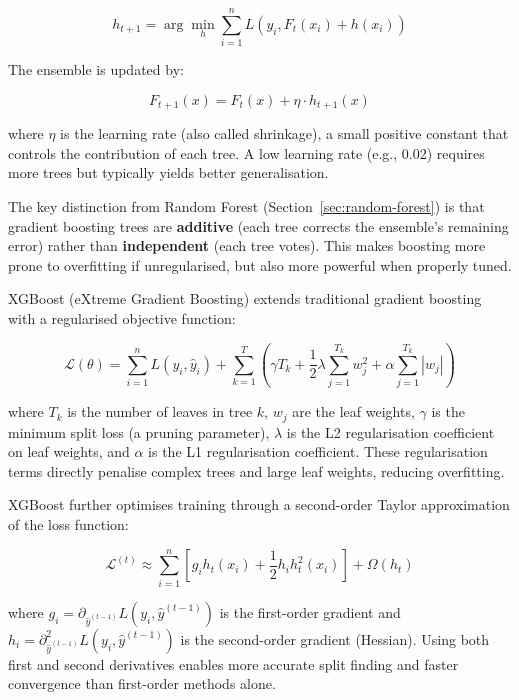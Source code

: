 \documentclass[10pt,a4paper]{article}
\begin{document}
\begin{equation}
h_{t+1} = \arg\min_{h} \sum_{i=1}^{n} L\left(y_i, F_t(x_i) + h(x_i)\right)
\label{eq:boost-objective}
\end{equation}

The ensemble is updated by:

\begin{equation}
F_{t+1}(x) = F_t(x) + \eta \cdot h_{t+1}(x)
\label{eq:boost-update}
\end{equation}

where $\eta$ is the learning rate (also called shrinkage), a small positive constant that controls the contribution of each tree. A low learning rate (e.g., 0.02) requires more trees but typically yields better generalisation.

The key distinction from Random Forest (Section~\ref{sec:random-forest}) is that gradient boosting trees are \textbf{additive} (each tree corrects the ensemble's remaining error) rather than \textbf{independent} (each tree votes). This makes boosting more prone to overfitting if unregularised, but also more powerful when properly tuned.

XGBoost (eXtreme Gradient Boosting) extends traditional gradient boosting with a regularised objective function:

\begin{equation}
\mathcal{L}(\theta) = \sum_{i=1}^{n} L(y_i, \hat{y}_i) + \sum_{k=1}^{T} \left(\gamma T_k + \frac{1}{2}\lambda \sum_{j=1}^{T_k} w_j^2 + \alpha \sum_{j=1}^{T_k} |w_j|\right)
\label{eq:xgb-objective}
\end{equation}

where $T_k$ is the number of leaves in tree $k$, $w_j$ are the leaf weights, $\gamma$ is the minimum split loss (a pruning parameter), $\lambda$ is the L2 regularisation coefficient on leaf weights, and $\alpha$ is the L1 regularisation coefficient. These regularisation terms directly penalise complex trees and large leaf weights, reducing overfitting.

XGBoost further optimises training through a second-order Taylor approximation of the loss function:

\begin{equation}
\mathcal{L}^{(t)} \approx \sum_{i=1}^{n} \left[g_i h_t(x_i) + \frac{1}{2} h_i h_t^2(x_i)\right] + \Omega(h_t)
\label{eq:xgb-taylor}
\end{equation}

where $g_i = \partial_{\hat{y}^{(t-1)}} L(y_i, \hat{y}^{(t-1)})$ is the first-order gradient and $h_i = \partial^2_{\hat{y}^{(t-1)}} L(y_i, \hat{y}^{(t-1)})$ is the second-order gradient (Hessian). Using both first and second derivatives enables more accurate split finding and faster convergence than first-order methods alone.
\end{document}

